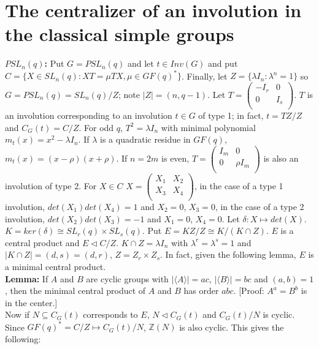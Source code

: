 \section{The centralizer of an involution in the classical simple groups}
{\bf $PSL_n(q)$:} Put $G = PSL_n(q)$ and let $t \in Inv(G)$ and put $C = \{X \in SL_n(q): XT=\mu TX, \mu \in GF(q)^*\}$.  Finally,
let $Z = \{ \lambda I_n: \lambda^n=1 \}$ so $G = PSL_n(q) = SL_n(q)/Z$; note $|Z|= (n, q-1)$.  Let $T=
\left(
\begin{array}{cc}
-I_r & 0 \\
0 &  I_s \\
\end{array}
\right)$.
$T$ is an involution corresponding to an involution $t \in G$ of type 1; in fact, $t=TZ/Z$ and $C_G(t) = C/Z$.
For odd $q$, $T^2= \lambda I_n$ with minimal polynomial $m_t(x)=x^2-\lambda I_n$.  If $\lambda$ is a quadratic residue
in $GF(q)$, $m_t(x) = (x-\rho)(x+\rho)$.  If $n=2m$ is even, 
$T= \left(
\begin{array}{cc}
I_m &  0 \\
0 &  \rho I_m \\
\end{array}
\right)$ is also an involution of type 2.
For $X \in C$ $X=
\left(
\begin{array}{cc}
X_1 &  X_2 \\
X_3 &  X_4 \\
\end{array} \right)$, in the case of a type 1 involution, $det(X_1) det(X_4) =1$ and $X_2=0$, $X_3 =0$,
in the case of a type 2 involution, $det(X_2) det(X_3) = -1$ and $X_1=0$, $X_4 =0$.  Let $\delta: X \mapsto det(X)$.
$K= ker(\delta) \cong SL_r(q) \times SL_s(q)$. Put $E= KZ/Z \cong K/(K \cap Z)$.  $E$ is a central product and
$E \lhd C/Z$.  $K \cap Z = \lambda I_n$ with $\lambda^r = \lambda^s = 1$ and $|K \cap Z| = (d,s)=(d,r)$, $Z= Z_r \times Z_s$. In fact,
given the following lemma, $E$ is a minimal central product.\\
{\bf Lemma:}  If  $A$ and $B$ are cyclic groups with
$|\langle A \rangle| =ac$,
$|\langle B \rangle| =bc$ and $(a,b)=1$, then the minimal central product of $A$ and $B$ has order $abc$. [Proof: $A^a=B^b$ is in the center.]
\\
Now if $N \subseteq C_G(t)$ corresponds to $E$, $N \lhd C_G(t)$ and $C_G(t)/N$ is cyclic.  Since $GF(q)^* = C/Z \mapsto C_G(t)/N$,
$\mathbb{Z}(N)$ is also cyclic.  This gives the following:\\
\\
